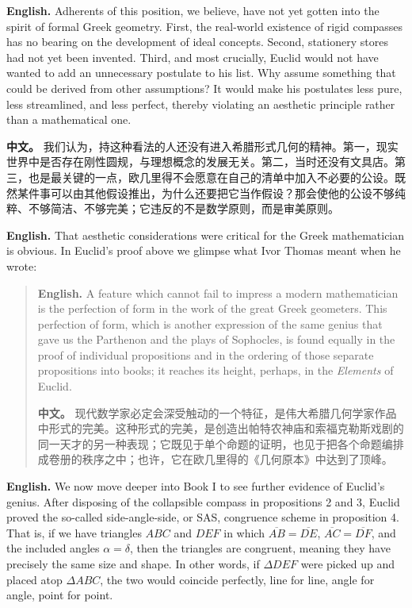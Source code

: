 \noindent\textbf{English.} Adherents of this position, we believe, have not yet gotten into the spirit of formal Greek geometry. First, the real-world existence of rigid compasses has no bearing on the development of ideal concepts. Second, stationery stores had not yet been invented. Third, and most crucially, Euclid would not have wanted to add an unnecessary postulate to his list. Why assume something that could be derived from other assumptions? It would make his postulates less pure, less streamlined, and less perfect, thereby violating an aesthetic principle rather than a mathematical one.

\noindent\textbf{中文。} 我们认为，持这种看法的人还没有进入希腊形式几何的精神。第一，现实世界中是否存在刚性圆规，与理想概念的发展无关。第二，当时还没有文具店。第三，也是最关键的一点，欧几里得不会愿意在自己的清单中加入不必要的公设。既然某件事可以由其他假设推出，为什么还要把它当作假设？那会使他的公设不够纯粹、不够简洁、不够完美；它违反的不是数学原则，而是审美原则。

\noindent\textbf{English.} That aesthetic considerations were critical for the Greek mathematician is obvious. In Euclid's proof above we glimpse what Ivor Thomas meant when he wrote:

\begin{quote}
\noindent\textbf{English.} A feature which cannot fail to impress a modern mathematician is the perfection of form in the work of the great Greek geometers. This perfection of form, which is another expression of the same genius that gave us the Parthenon and the plays of Sophocles, is found equally in the proof of individual propositions and in the ordering of those separate propositions into books; it reaches its height, perhaps, in the \textit{Elements} of Euclid.

\noindent\textbf{中文。} 现代数学家必定会深受触动的一个特征，是伟大希腊几何学家作品中形式的完美。这种形式的完美，是创造出帕特农神庙和索福克勒斯戏剧的同一天才的另一种表现；它既见于单个命题的证明，也见于把各个命题编排成卷册的秩序之中；也许，它在欧几里得的《几何原本》中达到了顶峰。
\end{quote}

\noindent\textbf{English.} We now move deeper into Book I to see further evidence of Euclid's genius. After disposing of the collapsible compass in propositions 2 and 3, Euclid proved the so-called side-angle-side, or SAS, congruence scheme in proposition 4. That is, if we have triangles $ABC$ and $DEF$ in which $\overline{AB}=\overline{DE}$, $\overline{AC}=\overline{DF}$, and the included angles $\alpha=\delta$, then the triangles are congruent, meaning they have precisely the same size and shape. In other words, if $\Delta DEF$ were picked up and placed atop $\Delta ABC$, the two would coincide perfectly, line for line, angle for angle, point for point.

